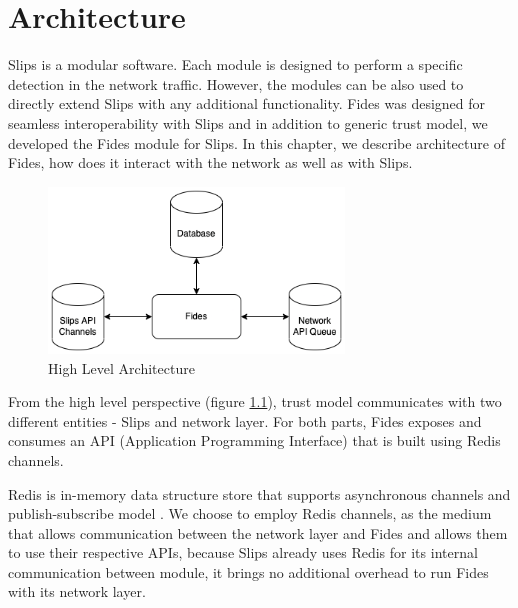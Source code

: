 \chapter{Architecture}
\label{ch:architecture}
Slips is a modular software. Each module is designed to perform a specific detection in the network traffic.\cite{slips}
However, the modules can be also used to directly extend Slips with any additional functionality. 
Fides was designed for seamless interoperability with Slips and in addition to generic trust model, we developed the Fides module for Slips.
In this chapter, we describe architecture of Fides, how does it interact with the network as well as with Slips.

\begin{figure}[ht]
    \centering
    \includegraphics[width=0.7\textwidth]{assets/high_architecture.png}
    \caption{High Level Architecture}
    \label{fig:high-level-architecture}
\end{figure}

From the high level perspective (figure \ref{fig:high-level-architecture}), trust model communicates with two different entities - Slips and network layer.
For both parts, Fides exposes and consumes an API (Application Programming Interface) that is built using Redis channels.

Redis is in-memory data structure store that supports asynchronous channels and publish-subscribe model \cite{redis}.
We choose to employ Redis channels, as the medium that allows communication between the network layer and Fides and allows them to use their respective APIs, because Slips already uses Redis for its internal communication between module, it brings no additional overhead to run Fides with its network layer.



